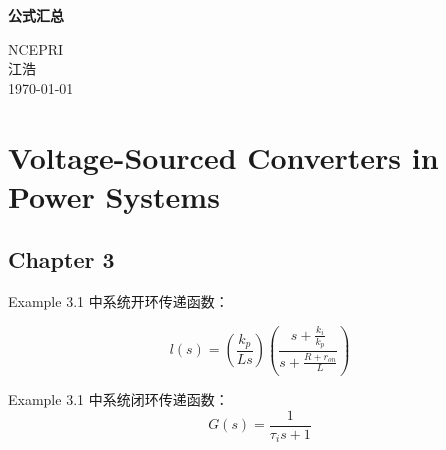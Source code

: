 \documentclass[12pt, a4paper, UTF8, fontset=adobe, oneside]{ctexbook} %
\begin{document}
\frontmatter
\begin{titlepage}
\begin{center}

\vspace*{5cm}
{\huge \bfseries 公式汇总}\\[0.4cm]

\vspace{12cm}

{\large NCEPRI} \\[0.3cm]
{\large 江浩} \\[1cm]
{\large \today}

\end{center}
\end{titlepage}

{
\hypersetup{linkcolor=black} %
\tableofcontents %
}

\mainmatter %

\chapter{Voltage-Sourced Converters in Power Systems}

\section{Chapter 3}

Example 3.1 中系统开环传递函数：

\begin{equation}
  l(s) = \left( \frac{k_p}{Ls} \right) \left( \frac{s+\frac{k_i}{k_p}}{s+\frac{R+r_{on}}{L}} \right) 
\end{equation}

Example 3.1 中系统闭环传递函数：
\begin{equation}
  G(s) = \frac{1}{\tau_i s+1}
\end{equation}
\end{document}
